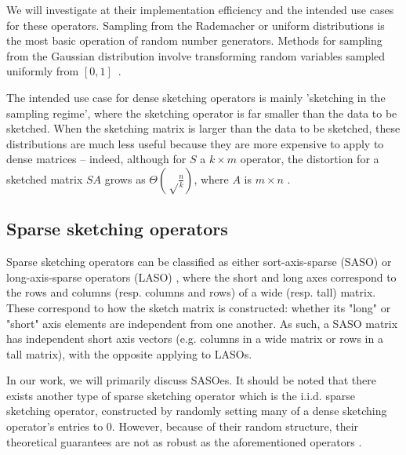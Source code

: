 \documentclass{article}
\begin{document}


We will investigate at their implementation efficiency and the intended use cases for these operators. Sampling from the Rademacher or uniform distributions is the most basic operation of random number generators. Methods for sampling from the Gaussian distribution involve transforming random variables sampled uniformly from $[0,1]$~\cite{murray2023randomizednumericallinearalgebra}.

The intended use case for dense sketching operators is mainly 'sketching in the sampling regime', where the sketching operator is far smaller than the data to be sketched. When the sketching matrix is larger than the data to be sketched, these distributions are much less useful because they are more expensive to apply to dense matrices\cite{murray2023randomizednumericallinearalgebra} -- indeed, although for $S$ a $k \times m$ operator, the distortion for a sketched matrix $SA$ grows as $\Theta(\sqrt \frac nk)$, where $A$ is $m \times n$ \cite{magdonismail2019fastfixeddimensionl2subspace}.


\subsection{Sparse sketching operators}
Sparse sketching operators can be classified as either sort-axis-sparse (SASO) or long-axis-sparse operators (LASO) \cite{murray2023randomizednumericallinearalgebra}, where the short and long axes correspond to the rows and columns (resp. columns and rows) of a wide (resp. tall) matrix. These correspond to how the sketch matrix is constructed: whether its "long" or "short" axis elements are independent from one another. As such, a SASO matrix has independent short axis vectors (e.g. columns in a wide matrix or rows in a tall matrix), with the opposite applying to LASOs.

In our work, we will primarily discuss SASOes. %
It should be noted that there exists another type of sparse sketching operator which is the i.i.d. sparse sketching operator, constructed by randomly setting many of a dense sketching operator's entries to $0$. However, because of their random structure, their theoretical guarantees are not as robust as the aforementioned operators \cite{murray2023randomizednumericallinearalgebra}.
\end{document}
